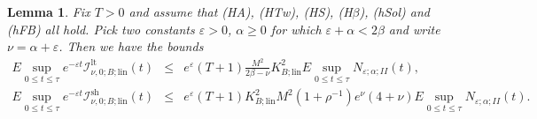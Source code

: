 \documentclass[10pt]{articleHJ}
\newcommand{\e}{\ensuremath{\varepsilon}}
\newtheorem{lem}[thm]{Lemma}
\numberwithin{equation}{section}
\begin{document}
\begin{lem}
\label{lem:nls:st:sup:on:b:lin:i}
Fix $T > 0$ and assume that (HA), (HTw), (HS),
(H$\beta$),
(hSol) and (hFB) all hold.
Pick two constants $\e > 0$, $\alpha \ge 0$
for which $\e + \alpha < 2 \beta$
and write $\nu = \alpha + \e$.
Then we have the bounds
\begin{equation}
\begin{array}{lcl}
E \sup_{0 \le t \le \tau}
    e^{-\e t} \mathcal{I}^{\mathrm{lt}}_{\nu,0;B; \mathrm{lin}}(t)
& \le &
  e^{\e} (T + 1) \frac{M^2}{2 \beta - \nu} K_{B;\mathrm{lin}}^2
  E  \sup_{0 \le t \le \tau} N_{\e;\alpha;II}(t) ,
\\[0.2cm]
E \sup_{0 \le t \le \tau}
    e^{-\e t} \mathcal{I}^{\mathrm{sh}}_{\nu,0;B; \mathrm{lin}}(t)
& \le &
  e^{\e} (T + 1)
   K_{B;\mathrm{lin}}^2 M^2 (1 + \rho^{-1}) e^{\nu}( 4  + \nu )
  E  \sup_{0 \le t \le \tau} N_{\e;\alpha;II}(t) .
\end{array}
\end{equation}
\end{lem}
\end{document}
